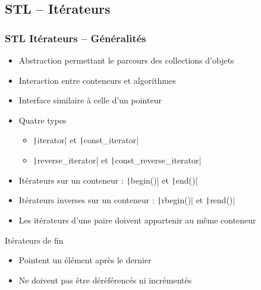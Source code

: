 \documentclass[C++.tex]{subfiles}
\begin{document}
\subsection*{STL -- Itérateurs}
\begin{frame}[fragile]
	\frametitle{STL Itérateurs -- Généralités}
	\begin{itemize}
		\item Abstraction permettant le parcours des collections d'objets
		\item Interaction entre conteneurs et algorithmes
		\item Interface similaire à celle d'un pointeur
		\item Quatre types
		\begin{itemize}
			\item \texttt|iterator| et \texttt|const_iterator|
			\item \texttt|reverse_iterator| et \texttt|const_reverse_iterator|


		\end{itemize}
		\item Itérateurs sur un conteneur : \texttt|begin()| et \texttt|end()|
		\item Itérateurs inverses sur un conteneur : \texttt|rbegin()| et \texttt|rend()|
		\item Les itérateurs d'une paire doivent appartenir au même conteneur
	\end{itemize}

	\begin{alertblock}{Itérateurs de fin}
		\begin{itemize}
			\item Pointent un élément après le dernier
			\item Ne doivent pas être déréférencés ni incrémentés
		\end{itemize}
	\end{alertblock}

\end{frame}
\end{document}
